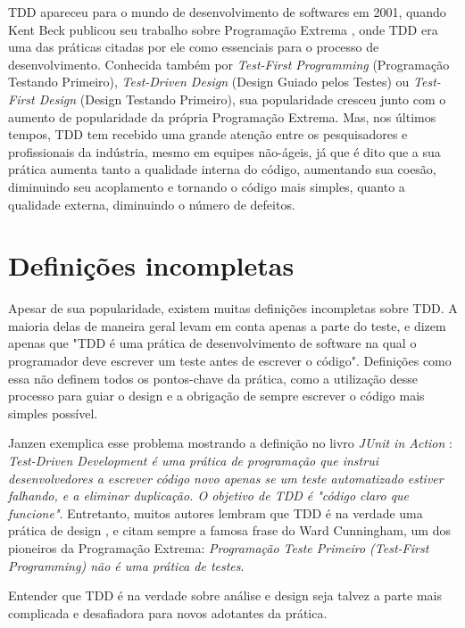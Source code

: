 
TDD apareceu para o mundo de desenvolvimento de softwares em 2001, quando Kent Beck publicou seu trabalho sobre Programação Extrema \cite{XPExplained},
onde TDD era uma das práticas citadas por ele como essenciais para o processo de desenvolvimento. Conhecida também
por \textit{Test-First Programming} (Programação Testando Primeiro), \textit{Test-Driven Design} (Design Guiado pelos Testes) ou 
\textit{Test-First Design} (Design Testando Primeiro), sua popularidade cresceu junto com o aumento de popularidade da própria Programação Extrema. 
Mas, nos últimos tempos, TDD tem recebido uma grande atenção entre os pesquisadores e profissionais da indústria, mesmo em equipes não-ágeis, já que
é dito que a sua prática aumenta tanto a qualidade interna do código, aumentando sua coesão, diminuindo seu acoplamento e tornando
o código mais simples, quanto a qualidade externa, diminuindo o número de defeitos.


\section{Definições incompletas} 
\label{sec:tdd-definicoes-incompletas}

Apesar de sua popularidade, existem muitas definições incompletas sobre TDD. A maioria delas de maneira geral levam em conta
apenas a parte do teste, e dizem apenas
que "TDD é uma prática de desenvolvimento de software na qual o programador deve escrever um teste antes de escrever o código".
Definições como essa não definem todos os pontos-chave da prática, como a utilização desse processo para guiar o design e
a obrigação de sempre escrever o código mais simples possível.

Janzen \cite{tdd-taxonomy} exemplica esse problema mostrando a definição no livro \textit{JUnit in Action} \cite{junit-in-action}:
\textit{Test-Driven Development é uma prática de programação que instrui desenvolvedores a escrever código novo apenas se um teste
automatizado estiver falhando, e a eliminar duplicação. O objetivo de TDD é "código claro que funcione"}. 
Entretanto, muitos autores lembram que TDD é na verdade uma prática de design \cite{tdd-taxonomy} \cite{aim-fire}, 
e citam sempre a famosa frase do Ward Cunningham, um dos pioneiros da Programação Extrema:
\textit{Programação Teste Primeiro (Test-First Programming) não é uma prática de testes}. 

Entender que TDD é na verdade sobre análise e design seja talvez a parte mais complicada e desafiadora para novos adotantes da prática. 

